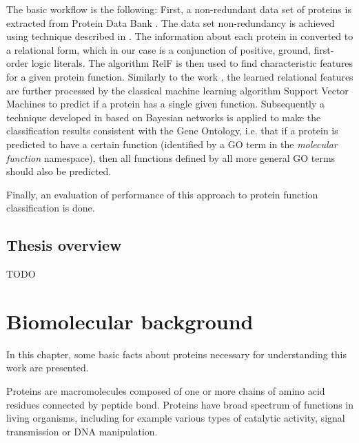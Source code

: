 \documentclass[11pt,twoside,a4paper]{book}
\begin{document}
The basic workflow is the following:
First, a non-redundant data set of proteins is extracted from Protein Data Bank \cite{pdb}.
The data set non-redundancy is achieved using technique described in \cite{maxind}.
The information about each protein in converted to a relational form, 
which in our case is a conjunction of positive, ground, first-order logic literals.
The algorithm RelF \cite{relf} is then used to find characteristic features
for a given protein function.
Similarly to the work \cite{szabova}, the learned relational features are further
processed by the classical machine learning algorithm Support Vector Machines
to predict if a protein has a single given function.
Subsequently a technique developed in \cite{bnet} based on Bayesian networks is applied to make the classification
results consistent with the Gene Ontology,
i.e. that if a protein is predicted to have a certain function
(identified by a GO term in the \emph{molecular function} namespace),
then all functions defined by all more general GO terms should also be predicted.

Finally, an evaluation of performance of this approach to protein function classification is done. 


\section{Thesis overview}
TODO



\chapter{Biomolecular background}
In this chapter, some basic facts about proteins
necessary for understanding this work are presented.

Proteins are macromolecules composed of one or more chains of amino acid residues
connected by peptide bond.
Proteins have broad spectrum of functions in living organisms, including for example 
various types of catalytic activity, signal transmission or DNA manipulation.
\end{document}
